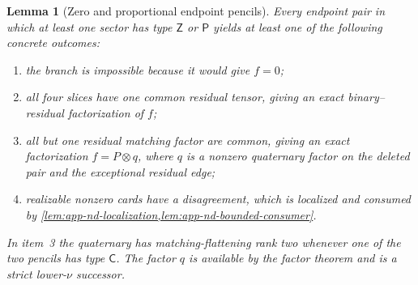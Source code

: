 \documentclass[11pt,letterpaper,onecolumn]{article}
\theoremstyle{plain}
\newtheorem{lemma}[lemma]{Lemma}
\theoremstyle{definition}
\theoremstyle{remark}
\begin{document}
\begin{lemma}[Zero and proportional endpoint pencils]
\label{lem:app-nd-exceptional-endpoints}
Every endpoint pair in which at least one sector has type \(\mathsf Z\) or \(\mathsf P\)
yields at least one of the following concrete outcomes:
\begin{enumerate}
\item the branch is impossible because it would give \(f=0\);
\item all four slices have one common residual tensor, giving an exact
      binary--residual factorization of \(f\);
\item all but one residual matching factor are common, giving an exact
      factorization \(f=P\otimes q\), where \(q\) is a nonzero quaternary
      factor on the deleted pair and the exceptional residual edge;
\item realizable nonzero cards have a disagreement, which is localized and
      consumed by \cref{lem:app-nd-localization,lem:app-nd-bounded-consumer}.
\end{enumerate}
In item~3 the quaternary has matching-flattening rank two whenever one of
the two pencils has type \(\mathsf{C}\).  The factor \(q\) is available by the factor theorem and is a strict lower-\(\nu\) successor.
\end{lemma}
\end{document}
